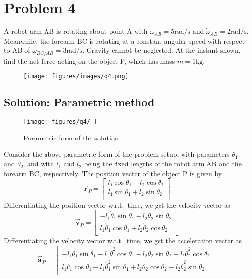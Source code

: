 \section*{Problem 4}

A robot arm AB is rotating about point A with \( \omega_{AB} = 5 \text{rad/s} \) and \( \dot\omega_{AB} = 2 \text{rad/s} \).
Meanwhile, the forearm BC is rotating at a constant angular speed with respect to AB of \( \omega_{BC/AB} = 3 \text{rad/s} \).
Gravity cannot be neglected.
At the instant shown, find the net force acting on the object P, which has mass \( m = 1\text{kg} \).

\begin{figure*}[h]
    \centering
    \texttt{[image: figures/images/q4.png]}
\end{figure*}

\subsection*{Solution: Parametric method}

\begin{figure*}[htb]
    \centering
    \texttt{[image: figures/q4/\_]}
    \caption{
        Parametric form of the solution
    }
\end{figure*}

Consider the above parametric form of the problem setup, with parameters \(\theta_1\) and \(\theta_2\), and with \(l_1\) and \(l_2\) being the fixed lengths of the robot arm AB and the forearm BC, respectively.
The position vector of the object P is given by
\[
    \vec{\mathbf{r}}_P =
    \begin{bmatrix}
        l_1 \cos\theta_1 + l_2 \cos\theta_2 \\
        l_1 \sin\theta_1 + l_2 \sin\theta_2 \\
    \end{bmatrix}
\]
Differentiating the position vector w.r.t.\ time, we get the velocity vector as
\[
    \vec{\mathbf{v}}_P =
    \begin{bmatrix}
        -l_1 \dot\theta_1 \sin\theta_1 - l_2 \dot\theta_2 \sin\theta_2 \\
        l_1 \dot\theta_1 \cos\theta_1 + l_2 \dot\theta_2 \cos\theta_2  \\
    \end{bmatrix}
\]
Differentiating the velocity vector w.r.t.\ time, we get the acceleration vector as
\[
    \vec{\mathbf{a}}_P =
    \begin{bmatrix}
        -l_1 \ddot\theta_1 \sin\theta_1 - l_1 \dot\theta_1^2 \cos\theta_1 - l_2 \ddot\theta_2 \sin\theta_2 - l_2 \dot\theta_2^2 \cos\theta_2 \\
        l_1 \ddot\theta_1 \cos\theta_1 - l_1 \dot\theta_1^2 \sin\theta_1 + l_2 \ddot\theta_2 \cos\theta_2 - l_2 \dot\theta_2^2 \sin\theta_2  \\
    \end{bmatrix}
\]

